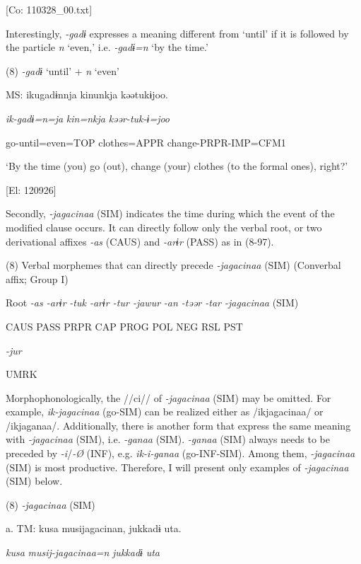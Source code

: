       [Co: 110328\_00.txt]

Interestingly, \textit{{}-gadɨ} expresses a meaning different from ‘until’ if it is followed by the particle \textit{n} ‘even,’ i.e. \textit{{}-gadɨ=n} ‘by the time.’

(8)  \textit{{}-gadɨ} ‘until’ + \textit{n} ‘even’

  MS:  ikugadɨnnja  kinunkja  kəətukɨjoo.

    \textit{ik-gadɨ=n=ja}  \textit{kin=nkja}  \textit{kəər-tuk-ɨ=joo}

    go-until=even=TOP  clothes=APPR  change-PRPR-IMP=CFM1

    ‘By the time (you) go (out), change (your) clothes (to the formal ones), right?’

    [El: 120926]

  Secondly, \textit{{}-jagacinaa} (SIM) indicates the time during which the event of the modified clause occurs. It can directly follow only the verbal root, or two derivational affixes \textit{{}-as} (CAUS) and \textit{{}-arɨr} (PASS) as in (8-97).

(8)  Verbal morphemes that can directly precede \textit{{}-jagacinaa} (SIM) (Converbal affix; Group I)

  Root  \textit{{}-as  {}-arɨr} %
\textit{{}-tuk  {}-arɨr  {}-tur  {}-jawur} %
\textit{{}-an  {}-təər  {}-tar  {}-jagacinaa} (SIM)

    CAUS  PASS  PRPR  CAP  PROG  POL  NEG  RSL  PST  

          \textit{{}-jur} 

          UMRK    

Morphophonologically, the //ci// of \textit{{}-jagacinaa} (SIM) may be omitted. For example, \textit{ik-jagacinaa} (go-SIM) can be realized either as /ikjagacinaa/ or /ikjaganaa/. Additionally, there is another form that express the same meaning with \textit{{}-jagacinaa} (SIM), i.e. \textit{{}-ganaa} (SIM). \textit{{}-ganaa} (SIM) always needs to be preceded by \textit{{}-i}/\textit{{}-Ø} (INF), e.g. \textit{ik-i-ganaa} (go-INF-SIM). Among them, \textit{{}-jagacinaa} (SIM) is most productive. Therefore, I will present only examples of \textit{{}-jagacinaa} (SIM) below.

(8)  \textit{{}-jagacinaa} (SIM)

  a.  TM:  kusa  musijagacinan,  jukkadɨ  uta.

      \textit{kusa}  \textit{musij-jagacinaa=n}  \textit{jukkadɨ}  \textit{uta}

